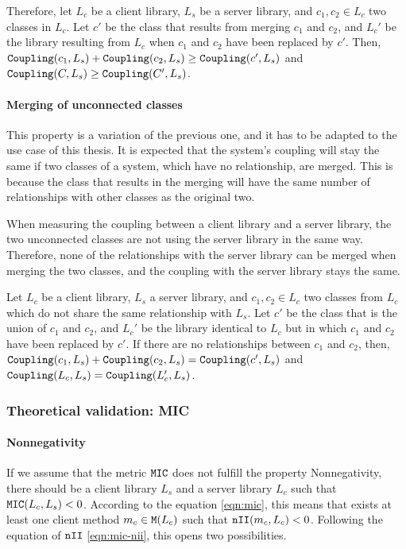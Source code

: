 Therefore, let $L_c$ be a client library, $L_s$ be a server library, and $c_1, c_2 \in L_c$ two classes in $L_c$. Let $c'$ be the class that results from merging  $c_1$ and $c_2$, and $L_c'$ be the library resulting from $L_c$ when $c_1$ and $c_2$ have been replaced by $c'$. Then, $\verb|Coupling|(c_1, L_s) + \verb|Coupling|(c_2, L_s) \ge \verb|Coupling|(c', L_s)$ and $\verb|Coupling|(C, L_s) \ge \verb|Coupling|(C', L_s)$.

\paragraph{Merging of unconnected classes}
This property is a variation of the previous one, and it has to be adapted to the use case of this thesis. It is expected that the system's coupling will stay the same if two classes of a system, which have no relationship, are merged. This is because the class that results in the merging will have the same number of relationships with other classes as the original two.

When measuring the coupling between a client library and a server library, the two unconnected classes are not using the server library in the same way. Therefore, none of the relationships with the server library can be merged when merging the two classes, and the coupling with the server library stays the same.

Let $L_c$ be a client library, $L_s$ a server library, and $c_1, c_2 \in L_c$ two classes from $L_c$ which do not share the same relationship with $L_s$. Let $c'$ be the class that is the union of  $c_1$ and $c_2$, and $L_c'$ be the library identical to $L_c$ but in which $c_1$ and $c_2$ have been replaced by $c'$. If there are no relationships between $c_1$ and $c_2$, then, $\verb|Coupling|(c_1, L_s) + \verb|Coupling|(c_2, L_s) = \verb|Coupling|(c', L_s)$ and $\verb|Coupling|(L_c, L_s) = \verb|Coupling|(L_c', L_s)$.

\subsubsection{Theoretical validation: MIC}

\paragraph{Nonnegativity}
If we assume that the metric $\verb|MIC|$ does not fulfill the property Nonnegativity, there should be a client library $L_s$ and a server library $L_c$ such that $\verb|MIC|(L_c, L_s) < 0$.
According to the equation \ref{eqn:mic}, this means that exists at least one client method $m_c \in \verb|M|(L_c)$ such that $\verb|nII|(m_c, L_c) < 0$. Following the equation of $\verb|nII|$ \ref{eqn:mic-nii}, this opens two possibilities.


